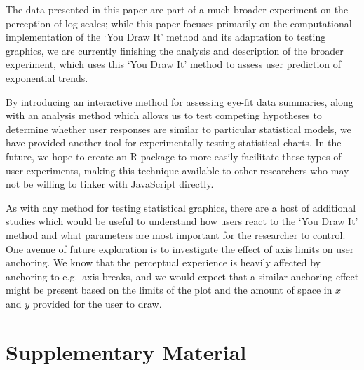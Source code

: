 \documentclass[
]{jds}
\begin{document}
The data presented in this paper are part of a much broader experiment
on the perception of log scales; while this paper focuses primarily on
the computational implementation of the `You Draw It' method and its
adaptation to testing graphics, we are currently finishing the analysis
and description of the broader experiment, which uses this `You Draw It'
method to assess user prediction of exponential trends.

By introducing an interactive method for assessing eye-fit data
summaries, along with an analysis method which allows us to test
competing hypotheses to determine whether user responses are similar to
particular statistical models, we have provided another tool for
experimentally testing statistical charts. In the future, we hope to
create an R package to more easily facilitate these types of user
experiments, making this technique available to other researchers who
may not be willing to tinker with JavaScript directly.

As with any method for testing statistical graphics, there are a host of
additional studies which would be useful to understand how users react
to the `You Draw It' method and what parameters are most important for
the researcher to control. One avenue of future exploration is to
investigate the effect of axis limits on user anchoring. We know that
the perceptual experience is heavily affected by anchoring to e.g.~axis
breaks, and we would expect that a similar anchoring effect might be
present based on the limits of the plot and the amount of space in \(x\)
and \(y\) provided for the user to draw.

\hypertarget{supplementary-material}{%
\section*{Supplementary Material}\label{supplementary-material}}
\end{document}
